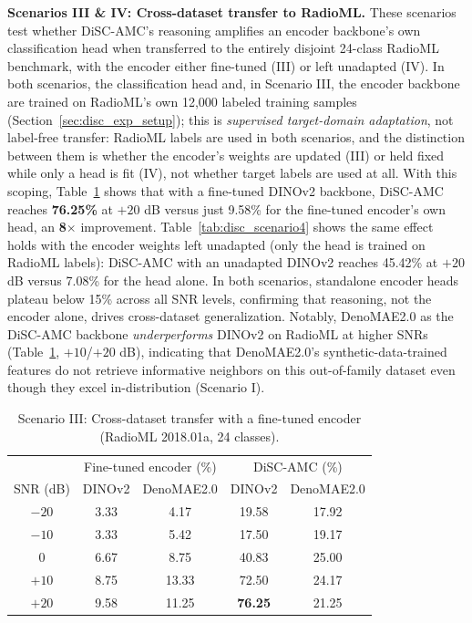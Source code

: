 \textbf{Scenarios III \& IV: Cross-dataset transfer to RadioML.} These scenarios test whether DiSC-AMC's reasoning amplifies an encoder backbone's own classification head when transferred to the entirely disjoint 24-class RadioML benchmark, with the encoder either fine-tuned (III) or left unadapted (IV). In both scenarios, the classification head and, in Scenario III, the encoder backbone are trained on RadioML's own 12,000 labeled training samples (Section~\ref{sec:disc_exp_setup}); this is \emph{supervised target-domain adaptation}, not label-free transfer: RadioML labels are used in both scenarios, and the distinction between them is whether the encoder's weights are updated (III) or held fixed while only a head is fit (IV), not whether target labels are used at all. With this scoping, Table~\ref{tab:disc_scenario3} shows that with a fine-tuned DINOv2 backbone, DiSC-AMC reaches \textbf{76.25\%} at $+20$ dB versus just 9.58\% for the fine-tuned encoder's own head, an \textbf{8$\times$} improvement. Table~\ref{tab:disc_scenario4} shows the same effect holds with the encoder weights left unadapted (only the head is trained on RadioML labels): DiSC-AMC with an unadapted DINOv2 reaches 45.42\% at $+20$ dB versus 7.08\% for the head alone. In both scenarios, standalone encoder heads plateau below 15\% across all SNR levels, confirming that reasoning, not the encoder alone, drives cross-dataset generalization. Notably, DenoMAE2.0 as the DiSC-AMC backbone \emph{underperforms} DINOv2 on RadioML at higher SNRs (Table~\ref{tab:disc_scenario3}, $+10$/$+20$ dB), indicating that DenoMAE2.0's synthetic-data-trained features do not retrieve informative neighbors on this out-of-family dataset even though they excel in-distribution (Scenario I).

\begin{table}[htbp]
\centering
\caption{Scenario III: Cross-dataset transfer with a fine-tuned encoder (RadioML 2018.01a, 24 classes).}
\label{tab:disc_scenario3}
\begin{tabular}{c cc cc}
\toprule
 & \multicolumn{2}{c}{Fine-tuned encoder (\%)} & \multicolumn{2}{c}{DiSC-AMC (\%)} \\
SNR (dB) & DINOv2 & DenoMAE2.0 & DINOv2 & DenoMAE2.0 \\
\midrule
$-20$ & 3.33 & 4.17  & 19.58 & 17.92 \\
$-10$ & 3.33 & 5.42  & 17.50 & 19.17 \\
$0$   & 6.67 & 8.75  & 40.83 & 25.00 \\
$+10$ & 8.75 & 13.33 & 72.50 & 24.17 \\
$+20$ & 9.58 & 11.25 & \textbf{76.25} & 21.25 \\
\bottomrule
\end{tabular}
\end{table}

